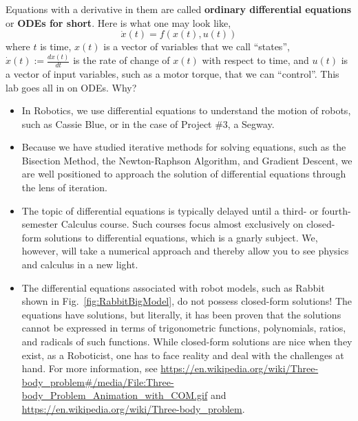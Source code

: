 Equations with a derivative in them are called \textbf{ordinary differential equations} or \textbf{ODEs for short}. Here is what one may look like,
\begin{equation}
    \label{eq:SampleODE}
    \dot{x}(t) = f(x(t), u(t))
\end{equation}
where $t$ is time, $x(t)$ is a vector of variables that we call ``states'', $\dot{x}(t):=\frac{dx(t)}{dt}$ is the rate of change of $x(t)$ with respect to time, and $u(t)$ is a vector of input variables, such as a motor torque, that we can ``control''. This lab goes all in on ODEs. Why? 
\begin{itemize}
    \item In Robotics, we use differential equations to understand the motion of robots, such as Cassie Blue, or in the case of Project \#3, a Segway.
    \item Because we have studied iterative methods for solving equations, such as the Bisection Method, the Newton-Raphson Algorithm, and Gradient Descent, we are well positioned to approach the solution of differential equations through the lens of iteration. 
    \item  The topic of differential equations is typically delayed until a third- or fourth-semester Calculus course. Such courses focus almost exclusively on closed-form solutions to differential equations, which is a gnarly subject. We, however, will take a numerical approach and thereby allow you to see physics and calculus in a new light. 
    \item The differential equations associated with robot models, such as Rabbit shown in Fig.~\ref{fig:RabbitBigModel}, do not possess closed-form solutions! The equations have solutions, but literally, it has been proven that the solutions cannot be expressed in terms of trigonometric functions, polynomials, ratios, and radicals of such functions.  While closed-form solutions are nice when they exist, as a Roboticist, one has to face reality and deal with the challenges at hand. For more information, see \url{https://en.wikipedia.org/wiki/Three-body_problem#/media/File:Three-body_Problem_Animation_with_COM.gif} and  \url{https://en.wikipedia.org/wiki/Three-body_problem}.
\end{itemize}



